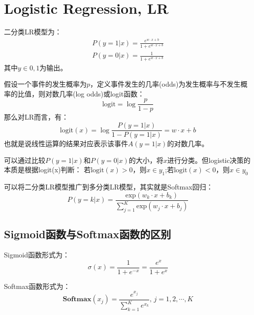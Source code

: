 \section{Logistic Regression, LR}
二分类LR模型为：
\begin{gather*}
    P(y=1|x) = \frac{e^{w\cdot x + b}}{1 + e^{w\cdot x + b}}\\
    P(y=0|x) = \frac{1}{1 + e^{w\cdot x + b}}
\end{gather*}
其中$y\in{0,1}$为输出。

假设一个事件的发生概率为$p$，定义事件发生的几率(odds)为发生概率与不发生概率的比值，则对数几率(log odds)或logit函数：
\begin{equation*}
    \text{logit} = \log \frac{p}{1-p}
\end{equation*}
那么对LR而言，有：
\begin{equation*}
    \text{logit}(x) = \log\frac{P(y=1|x)}{1-P({y=1|x})} = w\cdot x + b
\end{equation*}
也就是说线性运算的结果对应表示该事件$A(y=1|x)$的对数几率。

可以通过比较$P(y=1|x)$和$P(y=0|x)$的大小，将$x$进行分类。但logistic决策的本质是根据logit(x)判断：
若$\text{logit}(x) > 0$，则$x\in y_1$;若$\text{logit}(x) < 0$，则$x\in y_0$

可以将二分类LR模型推广到多分类LR模型，其实就是Softmax回归：
\begin{equation*}
    P(y=k|x) = \frac{\text{exp}(w_k\cdot x + b_k)}{\sum_{j=1}^K \text{exp}(w_j \cdot x + b_j)}
\end{equation*}

\subsection{Sigmoid函数与Softmax函数的区别}
Sigmoid函数形式为：
\begin{equation*}
    \sigma(x) = \frac{1}{1 + e^{-x}} = \frac{e^{x}}{1 + e^{x}}
\end{equation*}

Softmax函数形式为：
\begin{equation*}
    \textbf{Softmax}(x_j) = \frac{e^{x_j}}{\sum_{k=1}^K e^{x_k}},\, j=1,2,\cdots,K
\end{equation*}

